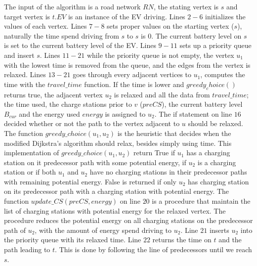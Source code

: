 The input of the algorithm is a road network $RN$, the stating vertex is $s$ and target vertex is $t$.$EV$ is an instance of the EV driving. Lines $2-6$ initializes the values of each vertex. Lines $7-8$ sets proper values on the starting vertex ($s$), naturally the time spend driving from $s$ to $s$ is $0$. The current battery level on $s$ is set to the current battery level of the EV. Lines $9-11$ sets up a priority queue and insert $s$. Lines $11-21$ while the priority queue is not empty, the vertex $u_1$ with the lowest time is removed from the queue, and the edges from the vertex is relaxed. Lines $13-21$ goes through every adjacent vertices to $u_1$, computes the time with the $travel\_time$ function. If the time is lower and $greedy_choice()$ returns true, the adjacent vertex $u_2$ is relaxed and all the data from $travel\_time$; the time used, the charge stations prior to $v$ ($preCS$), the current battery level $B_{cur}$ and the energy used $energy$ is assigned to $u_2$. The if statement on line $16$ decided whether or not the path to the vertex adjacent to $u$ should be relaxed. The function $greedy\_choice(u_1,u_2)$ is the heuristic that decides when the modified Dijkstra's algorithm should relax, besides simply using time. This implementation of $greedy\_choice(u_1,u_2)$ return True if $u_1$ has a charging station on it predecessor path with some potential energy, if $u_2$ is a charging station or if both $u_1$ and $u_2$ have no charging stations in their predecessor paths with remaining potential energy. False is returned if only $u_2$ has charging station on its predecessor path with a charging station with potential energy.
The function $update\_CS(preCS, energy)$ on line $20$ is a procedure that maintain the list of charging stations with potential energy for the relaxed vertex. The procedure reduces the potential energy on all charging stations on the predecessor path of $u_2$, with the amount of energy spend driving to $u_2$. Line $21$ inserts $u_2$ into the priority queue with its relaxed time. Line $22$ returns the time on $t$ and the path leading to $t$. This is done by following the line of predecessors until we reach $s$.

